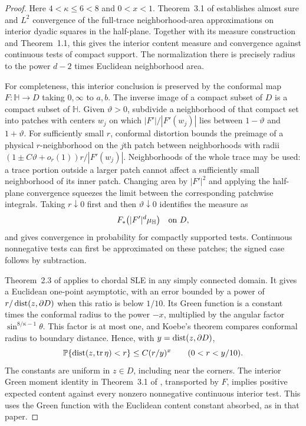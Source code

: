 \begin{proof}
Here $4<\kappa\le6<8$ and $0<x<1$.  Theorem~3.1 of
\cite{LawlerRezaeiContent} establishes almost sure and $L^2$
convergence of the full-trace neighborhood-area approximations on
interior dyadic squares in the half-plane.  Together with its
measure construction and Theorem~1.1, this gives the interior content
measure and convergence against continuous tests of compact support.
The normalization there is precisely radius to the power $d-2$
times Euclidean neighborhood area.

For completeness, this interior conclusion is preserved by the
conformal map $F:\mathbb H\to D$ taking $0,\infty$ to $a,b$.
The inverse image of a compact subset of $D$ is a compact subset of
$\mathbb H$.  Given $\vartheta>0$, subdivide a neighborhood of that
compact set into patches with centers $w_j$ on which
$|F'|/|F'(w_j)|$ lies between $1-\vartheta$ and $1+\vartheta$.
For sufficiently small $r$, conformal distortion bounds the preimage
of a physical $r$-neighborhood on the $j$th patch between neighborhoods
with radii $(1\pm C\vartheta+o_r(1))r/|F'(w_j)|$.
Neighborhoods of the whole
trace may be used: a trace portion outside a larger patch cannot
affect a sufficiently small neighborhood of its inner patch.
Changing area by $|F'|^2$ and applying the half-plane convergence
squeezes the limit between the corresponding patchwise integrals.
Taking $r\downarrow0$ first and then $\vartheta\downarrow0$ identifies
the measure as
\[
 F_*\bigl(|F'|^d\mu_{\mathbb H}\bigr)
 \quad\hbox{on }D,
\]
and gives convergence in probability for compactly supported tests.
Continuous nonnegative tests can first be approximated on these
patches; the signed case follows by subtraction.

Theorem~2.3 of \cite{LawlerRezaeiBasic} applies to chordal SLE in any
simply connected domain.  It gives a Euclidean one-point asymptotic,
with an error bounded by a power of
$r/\operatorname{dist}(z,\partial D)$ when this ratio is below $1/10$.
Its Green function is a constant times the conformal radius to the
power $-x$, multiplied by the angular factor
$\sin^{8/\kappa-1}\theta$.  This factor is at most one, and Koebe's
theorem compares conformal radius to boundary distance.  Hence, with
$y=\operatorname{dist}(z,\partial D)$,
\begin{equation}
 \mathbb P\{\operatorname{dist}(z,\operatorname{tr}\eta)<r\}
       \le C(r/y)^x\qquad(0<r<y/10).
 \label{eq:sle-distance-upper-bound}
\end{equation}
The constants are uniform in $z\in D$, including near the corners.
The interior Green moment identity in
Theorem~3.1 of \cite{LawlerRezaeiContent}, transported by $F$, implies
positive expected content against every nonzero nonnegative
continuous interior test.  This uses the Green function with the
Euclidean content constant absorbed, as in that paper.


\end{proof}
